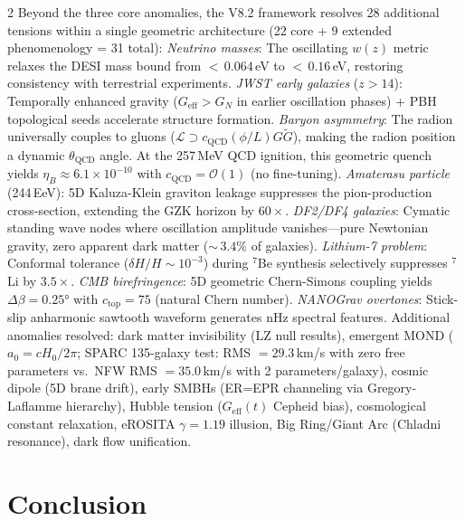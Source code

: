 \documentclass[11pt]{article}
\begin{document}
\begin{multicols}{2}
Beyond the three core anomalies, the V8.2 framework resolves 28 additional tensions within a single geometric architecture (22 core + 9 extended phenomenology = 31 total):
\textit{Neutrino masses}: The oscillating $w(z)$ metric relaxes the DESI mass bound from ${<}\,0.064$\,eV to ${<}\,0.16$\,eV, restoring consistency with terrestrial experiments.
\textit{JWST early galaxies} ($z > 14$): Temporally enhanced gravity ($G_\text{eff} > G_N$ in earlier oscillation phases) + PBH topological seeds accelerate structure formation.
\textit{Baryon asymmetry}: The radion universally couples to gluons ($\mathcal{L} \supset c_\text{QCD}(\phi/L)G\tilde{G}$), making the radion position a dynamic $\theta_\text{QCD}$ angle. At the 257\,MeV QCD ignition, this geometric quench yields $\eta_B \approx 6.1 \times 10^{-10}$ with $c_\text{QCD} = \mathcal{O}(1)$ (no fine-tuning).
\textit{Amaterasu particle} (244\,EeV): 5D Kaluza-Klein graviton leakage suppresses the pion-production cross-section, extending the GZK horizon by $60\times$.
\textit{DF2/DF4 galaxies}: Cymatic standing wave nodes where oscillation amplitude vanishes---pure Newtonian gravity, zero apparent dark matter (${\sim}\,3.4\%$ of galaxies).
\textit{Lithium-7 problem}: Conformal tolerance ($\delta H/H \sim 10^{-3}$) during $^7$Be synthesis selectively suppresses $^7$Li by $3.5\times$.
\textit{CMB birefringence}: 5D geometric Chern-Simons coupling yields $\Delta\beta = 0.25°$ with $c_\text{top} = 75$ (natural Chern number).
\textit{NANOGrav overtones}: Stick-slip anharmonic sawtooth waveform generates nHz spectral features.
Additional anomalies resolved: dark matter invisibility (LZ null results), emergent MOND ($a_0 = cH_0/2\pi$; SPARC 135-galaxy test: RMS $= 29.3$\,km/s with zero free parameters vs.\ NFW RMS $= 35.0$\,km/s with 2 parameters/galaxy), cosmic dipole (5D brane drift), early SMBHs (ER=EPR channeling via Gregory-Laflamme hierarchy), Hubble tension ($G_\text{eff}(t)$ Cepheid bias), cosmological constant relaxation, eROSITA $\gamma = 1.19$ illusion, Big Ring/Giant Arc (Chladni resonance), dark flow unification.

\section{Conclusion}


\end{multicols}
\end{document}
